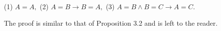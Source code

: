 (1) $A = A,$
(2) $A = B \rightarrow B = A,$
(3) $A = B \land B = C \rightarrow A = C.$

The proof is similar to that of Proposition 3.2 and is left to the reader.

